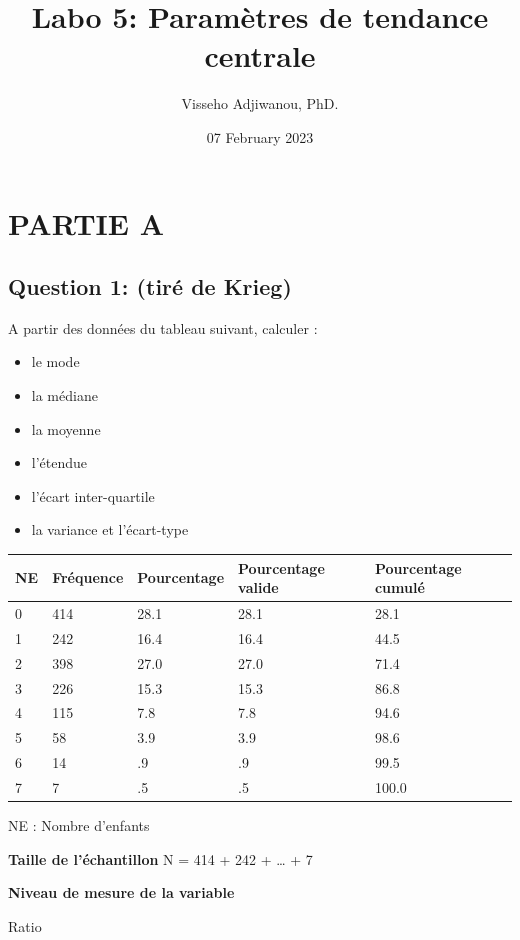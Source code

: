 \documentclass[
]{article}
\title{Labo 5: Paramètres de tendance centrale}
\author{Visseho Adjiwanou, PhD.}
\date{07 February 2023}
\providecommand{\tightlist}{%
  \setlength{\itemsep}{0pt}\setlength{\parskip}{0pt}}
\begin{document}
\maketitle

\hypertarget{partie-a}{%
\section{PARTIE A}\label{partie-a}}

\hypertarget{question-1-tiruxe9-de-krieg}{%
\subsection{Question 1: (tiré de
Krieg)}\label{question-1-tiruxe9-de-krieg}}

A partir des données du tableau suivant, calculer :

\begin{itemize}
\tightlist
\item
  le mode
\item
  la médiane
\item
  la moyenne
\item
  l'étendue
\item
  l'écart inter-quartile
\item
  la variance et l'écart-type
\end{itemize}

\begin{longtable}[]{@{}lllll@{}}
\toprule()
NE & Fréquence & Pourcentage & Pourcentage valide & Pourcentage
cumulé \\
\midrule()
\endhead
0 & 414 & 28.1 & 28.1 & 28.1 \\
1 & 242 & 16.4 & 16.4 & 44.5 \\
2 & 398 & 27.0 & 27.0 & 71.4 \\
3 & 226 & 15.3 & 15.3 & 86.8 \\
4 & 115 & 7.8 & 7.8 & 94.6 \\
5 & 58 & 3.9 & 3.9 & 98.6 \\
6 & 14 & .9 & .9 & 99.5 \\
7 & 7 & .5 & .5 & 100.0 \\
\bottomrule()
\end{longtable}

NE : Nombre d'enfants

\textbf{Taille de l'échantillon} N = 414 + 242 + \ldots{} + 7

\textbf{Niveau de mesure de la variable}

Ratio
\end{document}
